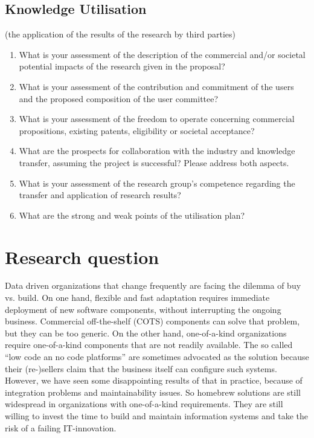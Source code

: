 \documentclass{elsarticle}
\begin{document}
\subsection{Knowledge Utilisation} (the application of the results of the research by third parties)
\begin{enumerate}
   \item  	What is your assessment of the description of the commercial and/or societal potential impacts of the research given in the proposal?
   \item 	What is your assessment of the contribution and commitment of the users and the proposed composition of the user committee?
   \item 	What is your assessment of the freedom to operate concerning commercial propositions, existing patents, eligibility or societal acceptance? 
   \item 	What are the prospects for collaboration with the industry and knowledge transfer, assuming the project is successful? Please address both aspects.
   \item 	What is your assessment of the research group's competence regarding the transfer and application of research results?
   \item 	What are the strong and weak points of the utilisation plan?   
\end{enumerate}

\section{Research question}
\label{sct:Research question}
   Data driven organizations that change frequently are facing the dilemma of buy vs. build.
   On one hand, flexible and fast adaptation requires immediate deployment of new software components, without interrupting the ongoing business.
   Commercial off-the-shelf (COTS) components can solve that problem, but they can be too generic.
   On the other hand, one-of-a-kind organizations require one-of-a-kind components that are not readily available.
   The so called ``low code an no code platforms'' are sometimes advocated as the solution
   because their (re-)sellers claim that the business itself can configure such systems.
   However, we have seen some disappointing results of that in practice, because of integration problems and maintainability issues.
   So homebrew solutions are still widespread in organizations with one-of-a-kind requirements.
   They are still willing to invest the time to build and maintain information systems and take the risk of a failing IT-innovation.
 
\end{document}
